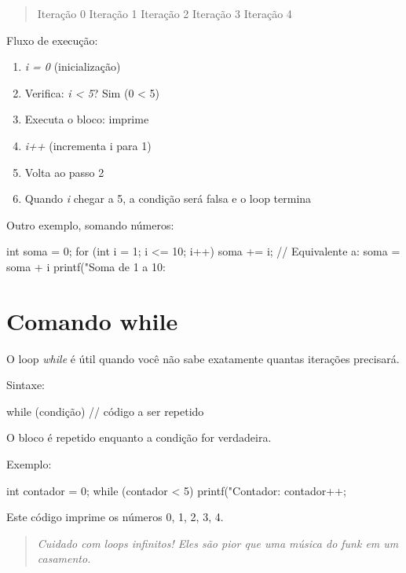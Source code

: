 \begin{quote}
  Iteração 0
  Iteração 1
  Iteração 2
  Iteração 3
  Iteração 4
\end{quote}

Fluxo de execução:

\begin{enumerate}
  \item \textit{i = 0} (inicialização)
  \item Verifica: \textit{i < 5}? Sim (0 < 5)
  \item Executa o bloco: imprime 
  \item \textit{i++} (incrementa i para 1)
  \item Volta ao passo 2
  \item Quando \textit{i} chegar a 5, a condição será falsa e o loop termina
\end{enumerate}

Outro exemplo, somando números:

\begin{ccode}
  int soma = 0;
  for (int i = 1; i <= 10; i++) {
    soma += i;  // Equivalente a: soma = soma + i
  }
  printf("Soma de 1 a 10: %
\end{ccode}

\section{Comando while}

O loop \textit{while} é útil quando você não sabe exatamente quantas iterações precisará.

Sintaxe:

\begin{ccode}
  while (condição) {
    // código a ser repetido
  }
\end{ccode}

O bloco é repetido enquanto a condição for verdadeira.

Exemplo:

\begin{ccode}
  int contador = 0;
  while (contador < 5) {
    printf("Contador: %
    contador++;
  }
\end{ccode}

Este código imprime os números 0, 1, 2, 3, 4.

\begin{quote}
\textit{Cuidado com loops infinitos! Eles são pior que uma música do funk em um casamento.}
\end{quote}

